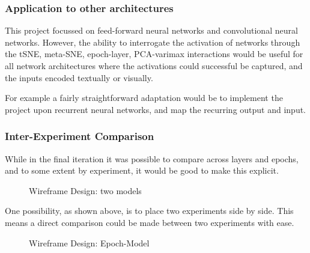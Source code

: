 \documentclass[a4paper,11pt,titlepage]{article}
\begin{document}
	\subsubsection{Application to other architectures}
	This project focussed on feed-forward neural networks and convolutional neural networks. However, the ability to interrogate the activation of networks through the tSNE, meta-SNE, epoch-layer, PCA-varimax interactions would be useful for all network architectures where the activations could successful be captured, and the inputs encoded textually or visually.
	\par 
	For example a fairly straightforward adaptation would be to implement the project upon recurrent neural networks, and map the recurring output and input.

	\subsubsection{Inter-Experiment Comparison}
	While in the final iteration it was possible to compare across layers and epochs, and to some extent by experiment, it would be good to make this explicit.
	\par 
		
	\begin{figure}[H]
    			\caption{Wireframe Design: two models}%
	\end{figure}	
	
	One possibility, as shown above, is to place two experiments side by side. This means a direct comparison could be made between two experiments with ease.
	
	\begin{figure}[H]
    			\caption{Wireframe Design: Epoch-Model}%
	\end{figure}	
	
\end{document}

